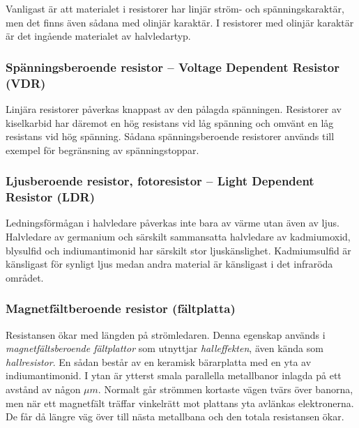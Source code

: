 Vanligast är att materialet i resistorer har linjär ström- och spänningskaraktär,
men det finns även sådana med olinjär karaktär. I resistorer med olinjär
karaktär är det ingående materialet av halvledartyp.

\subsubsection{Spänningsberoende resistor -- Voltage Dependent Resistor (VDR)}

Linjära resistorer påverkas knappast av den pålagda spänningen.
Resistorer av kiselkarbid har däremot en hög resistans vid låg spänning och
omvänt en låg resistans vid hög spänning.
Sådana spänningsberoende resistorer används till exempel för begränsning av
spänningstoppar.

\subsubsection{Ljusberoende resistor, fotoresistor -- Light Dependent Resistor (LDR)}

Ledningsförmågan i halvledare påverkas inte bara av värme utan även av ljus.
Halvledare av germanium och särskilt sammansatta halvledare av kadmiumoxid,
blysulfid och indiumantimonid har särskilt stor ljuskänslighet. Kadmiumsulfid
är känsligast för synligt ljus medan andra material är känsligast i det
infraröda området.

\subsubsection{Magnetfältberoende resistor (fältplatta)}

Resistansen ökar med längden på strömledaren. Denna egenskap används i
\emph{magnetfältsberoende fältplattor} som utnyttjar \emph{halleffekten}, även
kända som \emph{hallresistor}. En sådan består av en keramisk bärarplatta med
en yta av indiumantimonid. I ytan är ytterst smala parallella metallbanor
inlagda på ett avstånd av någon \(\mu m\).
Normalt går strömmen kortaste vägen tvärs över banorna, men när ett magnetfält
träffar vinkelrätt mot plattans yta avlänkas elektronerna.
De får då längre väg över till nästa metallbana och den totala resistansen
ökar.

